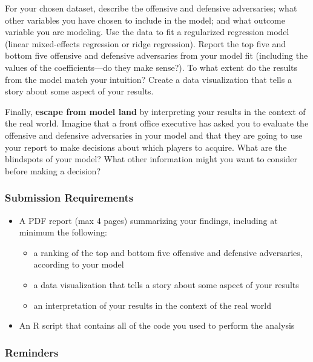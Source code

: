\documentclass{article}
\begin{document}
      For your chosen dataset, describe the offensive and defensive adversaries; what other variables you have chosen to include in the model; and what outcome variable you are modeling. Use the data to fit a regularized regression model (linear mixed-effects regression or ridge regression). Report the top five and bottom five offensive and defensive adversaries from your model fit (including the values of the coefficients---do they make sense?). To what extent do the results from the model match your intuition? Create a data visualization that tells a story about some aspect of your results.

      Finally, {\bf escape from model land} by interpreting your results in the context of the real world. Imagine that a front office executive has asked you to evaluate the offensive and defensive adversaries in your model and that they are going to use your report to make decisions about which players to acquire. What are the blindspots of your model? What other information might you want to consider before making a decision?

      \subsubsection*{\sc Submission Requirements}

        \begin{itemize}
          \item A PDF report (max 4 pages) summarizing your findings, including at minimum the following:
          \begin{itemize}
            \item a ranking of the top and bottom five offensive and defensive adversaries, according to your model
            \item a data visualization that tells a story about some aspect of your results
            \item an interpretation of your results in the context of the real world
          \end{itemize}
          \item An R script that contains all of the code you used to perform the analysis
        \end{itemize}

      \subsubsection*{\sc Reminders}
\end{document}
